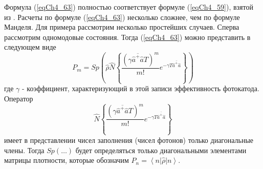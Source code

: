 Формула (\ref{eqCh4_63}) полностью соответствует формуле
(\ref{eqCh4_59}), взятой из \cite{bLoudon1976}. Расчеты по
формуле (\ref{eqCh4_63}) несколько 
сложнее, чем по формуле Манделя. Для примера рассмотрим несколько
простейших случаев. Сперва рассмотрим одномодовые состояния. Тогда
(\ref{eqCh4_63}) можно представить в следующем виде 
\[
P_m = Sp\left(
\hat{\rho}
\hat{N}
\left\{
\frac{\left(\gamma \overline{\hat{a}^{+} \hat{a}} T\right)^m}{m!}
e^{- \gamma T \overline{\hat{a}^{+} \hat{a}}}
\right\}
\right)
\]
где $\gamma$ - коэффициент, характеризующий в этой записи
эффективность фотокатода. Оператор 
\[
\hat{N}
\left\{
\frac{\left(\gamma \overline{\hat{a}^{+} \hat{a}} T\right)^m}{m!}
e^{- \gamma T \overline{\hat{a}^{+} \hat{a}}}
\right\}
\]
имеет в представлении чисел заполнения (чисел фотонов) только
диагональные члены. Тогда $Sp\left(\dots\right)$ будет определяться
только диагональными элементами матрицы плотности, 
которые обозначим $P_n = \left<n\right|\hat{\rho}\left|n\right>$.

